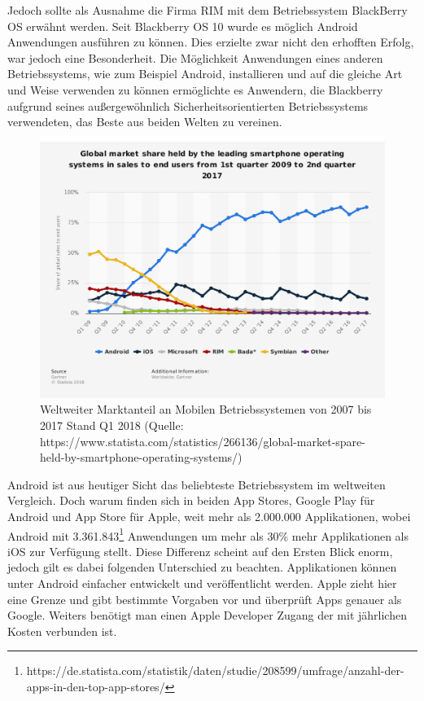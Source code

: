 	Jedoch sollte als Ausnahme die Firma RIM mit dem Betriebssystem BlackBerry OS erwähnt werden. Seit Blackberry OS 10 wurde es möglich Android Anwendungen ausführen zu können. Dies erzielte zwar nicht den erhofften Erfolg, war jedoch eine Besonderheit. Die Möglichkeit Anwendungen eines anderen Betriebssystems, wie zum Beispiel Android, installieren und auf die gleiche Art und Weise verwenden zu können ermöglichte es Anwendern, die Blackberry aufgrund seines außergewöhnlich Sicherheitsorientierten Betriebssystems verwendeten, das Beste aus beiden Welten zu vereinen.

	\newpage
	
	\begin{figure}[h!]
		\centering
		\includegraphics[width=1\textwidth]{images/statistic_id266136_global-mobile-os-market-share-2009-2017-by-quarter.png}
		\caption{Weltweiter Marktanteil an Mobilen Betriebssystemen von 2007 bis 2017 Stand Q1 2018 (Quelle: https://www.statista.com/statistics/266136/global-market-spare-held-by-smartphone-operating-systems/)}
		\label{fig:mobile-os-marketshares}
	\end{figure}
	Android ist aus heutiger Sicht das beliebteste Betriebssystem im weltweiten Vergleich. Doch warum finden sich in beiden App Stores, Google Play für Android und App Store für Apple, weit mehr als 2.000.000 Applikationen, wobei Android mit 3.361.843\footnote{https://de.statista.com/statistik/daten/studie/208599/umfrage/anzahl-der-apps-in-den-top-app-stores/} Anwendungen um mehr als 30\% mehr Applikationen als iOS zur Verfügung stellt. Diese Differenz scheint auf den Ersten Blick enorm, jedoch gilt es dabei folgenden Unterschied zu beachten. Applikationen können unter Android einfacher entwickelt und veröffentlicht werden. Apple zieht hier eine Grenze und gibt bestimmte Vorgaben vor und überprüft Apps genauer als Google. Weiters benötigt man einen Apple Developer Zugang der mit jährlichen Kosten verbunden ist.

